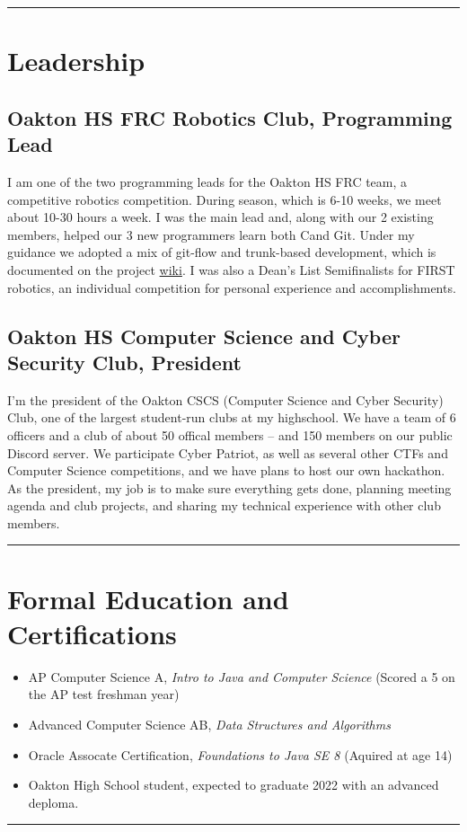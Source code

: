 \documentclass[10pt,letterpaper]{article}
\def\link#1#2{\color{blue!60!black}\href{#1}{#2}\color{black}}
\newcommand{\CPP}
{C\nolinebreak[4]\hspace{-.05em}\raisebox{.35ex}{\footnotesize\bf ++}}
\def\paddedItem#1{\vspace{-0.4em}\item #1}
\begin{document}
    \hrule
    \vspace{-0.4em}

    \section*{Leadership}
    \subsection*{Oakton HS FRC Robotics Club, Programming Lead}

    I am one of the two programming leads for the Oakton HS FRC team,
    a competitive robotics competition.
    During season, which is 6-10 weeks, we meet about 10-30 hours a week.
    I was the main lead and, along with our 2 existing members,
    helped our 3 new programmers learn both \CPP and Git.
    Under my guidance we adopted a mix of git-flow and trunk-based development,
    which is documented on the project \link{https://github.com/CougarProgramming623/InfiniteRecharge/wiki/Git}{wiki}.
    I was also a Dean's List Semifinalists for FIRST robotics,
    an individual competition for personal experience and accomplishments.

    \subsection*{Oakton HS Computer Science and Cyber Security Club, President}

    I'm the president of the Oakton CSCS (Computer Science and Cyber Security) Club,
    one of the largest student-run clubs at my highschool. 
    We have a team of 6 officers and a club of about 50 offical members -- and 150 members on our public Discord server.
    We participate Cyber Patriot, as well as several other CTFs and Computer Science competitions,
    and we have plans to host our own hackathon.
    As the president, my job is to make sure everything gets done, planning meeting agenda and club projects,
    and sharing my technical experience with other club members. 

    \vspace{1em}
    \hrule

    \section*{Formal Education and Certifications}
    \begin{itemize}
        \paddedItem AP Computer Science A, \textit{Intro to Java and Computer Science}  (Scored a 5 on the AP test freshman year)
        \paddedItem Advanced Computer Science AB, \textit{Data Structures and Algorithms}
        \paddedItem Oracle Assocate Certification, \textit{Foundations to Java SE 8} (Aquired at age 14)
        \paddedItem Oakton High School student, expected to graduate 2022 with an advanced deploma.
    \end{itemize}
    \vspace{0.3em}
    \hrule
    
\end{document}
